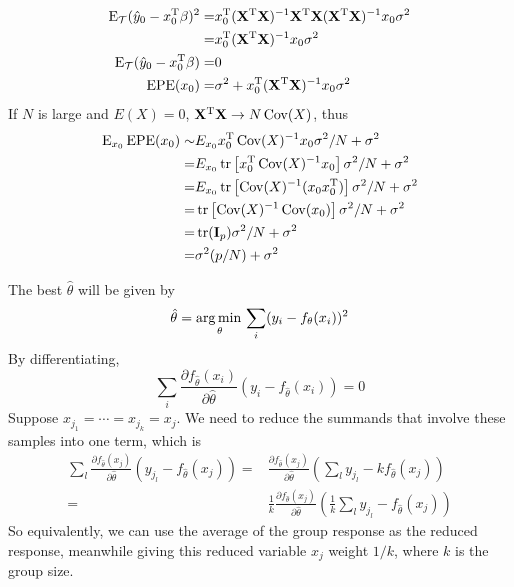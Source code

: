\begin{sol}
\begin{align*}
\operatorname{E}_\mathcal{T} (\hat{y}_0-x_0^\mathrm{T}\beta)^2 =& x_0^\mathrm{T}(\mathbf{X}^\mathrm{T}\mathbf{X})^{-1}\mathbf{X}^\mathrm{T}\mathbf{X}(\mathbf{X}^\mathrm{T}\mathbf{X})^{-1}x_0\sigma^2 \\
=& x_0^\mathrm{T}(\mathbf{X}^\mathrm{T}\mathbf{X})^{-1}x_0\sigma^2 \\
\operatorname{E}_\mathcal{T} (\hat{y}_0-x_0^\mathrm{T}\beta) =& 0 \\
\mathrm{EPE}(x_0) =& \sigma^2 + x_0^\mathrm{T}(\mathbf{X}^\mathrm{T}\mathbf{X})^{-1}x_0\sigma^2
\end{align*}
If $N$ is large and $E(X)=0$, $\mathbf{X}^\mathrm{T}\mathbf{X}\to N\operatorname{Cov}(X)$, thus
\begin{align*}
\operatorname{E}_{x_0}\mathrm{EPE}(x_0) \sim & E_{x_0} x_0^\mathrm{T}\operatorname{Cov}(X)^{-1}x_0\sigma^2/N + \sigma^2 \\
=& E_{x_0} \operatorname{tr} \left[x_0^\mathrm{T}\operatorname{Cov}(X)^{-1}x_0\right]\sigma^2/N + \sigma^2 \\
=& E_{x_0} \operatorname{tr} \left[\operatorname{Cov}(X)^{-1}(x_0x_0^\mathrm{T})\right]\sigma^2/N + \sigma^2 \\
=& \operatorname{tr}\left[ \operatorname{Cov}(X)^{-1} \operatorname{Cov}(x_0)\right]\sigma^2/N + \sigma^2 \\
=& \operatorname{tr}(\mathbf{I}_p)\sigma^2/N + \sigma^2 \\
=& \sigma^2(p/N) + \sigma^2
\end{align*}
\end{sol}

\begin{sol}
The best $\hat{\theta}$ will be given by 
\[
\hat{\theta}=\operatorname*{arg\,min\,}_\theta \sum_i (y_i-f_\theta(x_i))^2
\]
By differentiating,
\[
\sum_i \frac{\partial f_{\hat{\theta}}(x_i)}{\partial \hat{\theta}} (y_i-f_{\hat{\theta}}(x_i)) =0
\]
Suppose $x_{j_1}=\cdots=x_{j_k}=x_j$. We need to reduce the summands that involve these samples into one term, which is
\begin{align*}
\sum_l \frac{\partial f_{\hat{\theta}}(x_j)}{\partial \hat{\theta}} (y_{j_l}-f_{\hat{\theta}}(x_j)) =& \frac{\partial f_{\hat{\theta}}(x_j)}{\partial \hat{\theta}}\left(\sum_l y_{j_l} - k f_{\hat{\theta}}(x_j)\right) \\
=& \frac{1}{k} \frac{\partial f_{\hat{\theta}}(x_j)}{\partial \hat{\theta}}\left(\frac{1}{k}\sum_l y_{j_l}-f_{\hat{\theta}}(x_j)\right)
\end{align*}
So equivalently, we can use the average of the group response as the reduced response, meanwhile giving this reduced variable $x_j$ weight $1/k$, where $k$ is the group size.
\end{sol}

